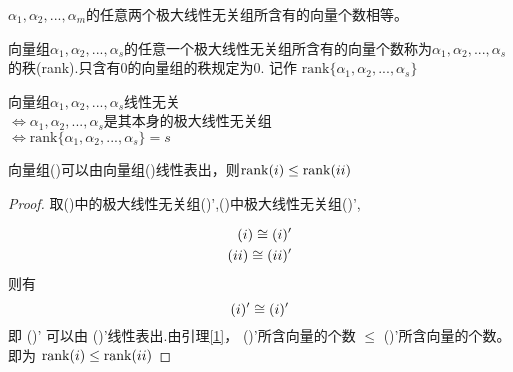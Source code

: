 \documentclass[blue,normal,cn]{elegantnote}
\begin{document}
\begin{corollary}
    $α_1,α_2,...,α_m$的任意两个极大线性无关组所含有的向量个数相等。
 \end{corollary}

\begin{definition}
    向量组$α_1,α_2,...,α_s$的任意一个极大线性无关组所含有的向量个数称为$α_1,α_2,...,α_s$的秩(rank).只含有0的向量组的秩规定为0.
    记作 $\mathrm{rank}\{α_1,α_2,...,α_s\}$
\end{definition}

\begin{proposition}
向量组$α_1,α_2,...,α_s$线性无关 \\
$\Leftrightarrow α_1,α_2,...,α_s$是其本身的极大线性无关组\\
$\Leftrightarrow \mathrm{rank}\{α_1,α_2,...,α_s\}=s$
\end{proposition}

\begin{proposition}
    向量组(\uppercase\expandafter{})可以由向量组(\uppercase\expandafter{})线性表出，则$\mathrm{rank}(\uppercase\expandafter{\romannumeral1}) \leq \mathrm{rank}(\uppercase\expandafter{\romannumeral2})$
\end{proposition}

\begin{proof}
    取(\uppercase\expandafter{})中的极大线性无关组(\uppercase\expandafter{})',(\uppercase\expandafter{})中极大线性无关组(\uppercase\expandafter{})',

    $$
        \begin{aligned}
            (\uppercase\expandafter{\romannumeral1})\cong (\uppercase\expandafter{\romannumeral1})'\\
            (\uppercase\expandafter{\romannumeral2}) \cong (\uppercase\expandafter{\romannumeral2})'
        \end{aligned}
    $$
    则有
    $$
        (\uppercase\expandafter{\romannumeral1})'\cong (\uppercase\expandafter{\romannumeral1})'\\
    $$
    即 (\uppercase\expandafter{})' 可以由  (\uppercase\expandafter{})'线性表出.由引理\ref{1}，  (\uppercase\expandafter{})'所含向量的个数 $\leq$ (\uppercase\expandafter{})'所含向量的个数。即为
    $\mathrm{rank}(\uppercase\expandafter{\romannumeral1}) \leq \mathrm{rank}(\uppercase\expandafter{\romannumeral2})$
\end{proof}
\end{document}
